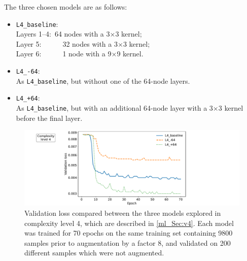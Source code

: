 The three chosen models are as follows:
\begin{itemize}
\item \texttt{L4\_baseline}: \\
\hspace*{1em}Layers 1--4:~64 nodes with a 3$\times$3 kernel; \\
\hspace*{1em}Layer 5:~~~~~~32 nodes with a 3$\times$3 kernel; \\
\hspace*{1em}Layer 6:~~~~~~1 node with a 9$\times$9 kernel.
\item \texttt{L4\_-64}: \\
\hspace*{1em}As \texttt{L4\_baseline}, but without one of the 64-node layers.
\item \texttt{L4\_+64}: \\
\hspace*{1em}As \texttt{L4\_baseline}, but with an additional 64-node layer with a 3$\times$3 kernel before the final layer.
\end{itemize}

\begin{figure}[tp]
\includegraphics[width=\textwidth]{v4_loss}
\caption{Validation loss compared between the three models explored in complexity level 4, which are described in \autoref{ml_Sec:v4}. Each model was trained for 70 epochs on the same training set containing 9800 samples prior to augmentation by a factor 8, and validated on 200 different samples which were not augmented.}
\label{ml_Fig:v4_loss}
\end{figure}

